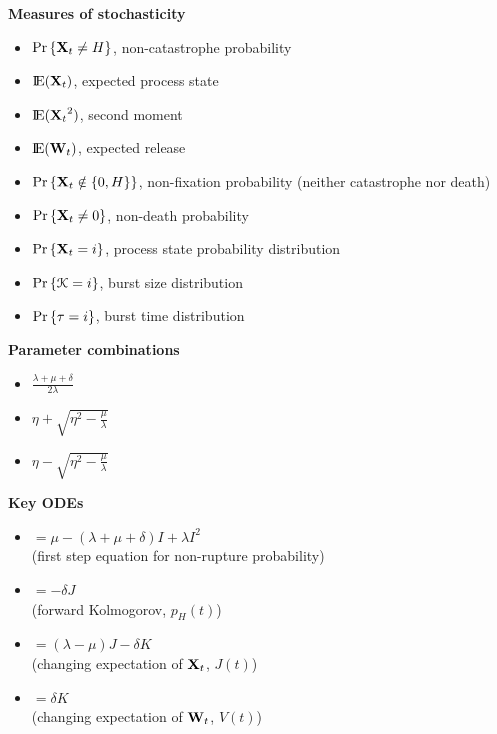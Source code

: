 \noindent
\textbf{Measures of stochasticity}
\begin{itemize}[leftmargin=\indentA]
\item[$I(t)$ :]${\text{Pr}\left\{{{\bf X}_t}\neq H\right\}}$, non-catastrophe probability
\item[$J(t)$ :]${\rm I}\!{\rm E}({{\bf X}_t})$, expected process state 
\item[$K(t)$ :]${\rm I}\!{\rm E}({{\bf X}_t}^2)$, second moment
\item[$V(t)$ :]${\rm I}\!{\rm E}({{\bf W}_t})$, expected release
\item[$I_{\text{fix}}(t)$ :]${\text{Pr}\left\{{{\bf X}_t}\notin \{0,H\}\right\}}$, non-fixation probability (neither catastrophe nor death)
\item[$I_{\text{death}}$ :]${\text{Pr}\left\{{{\bf X}_t}\neq0\right\}}$, non-death probability
\item[$p_k(t)$ :]${\text{Pr}\left\{{{\bf X}_t} = i\right\}}$, process state probability distribution
\item[$P_k$ :]${\text{Pr}\left\{\mathcal{K} = i\right\}}$, burst size distribution 
\item[$\phi_k$ :]${\text{Pr}\left\{\tau = i\right\}}$, burst time distribution 
\end{itemize}

\noindent
\textbf{Parameter combinations}
\begin{itemize}[leftmargin=\indentA]
\item[$\eta$ =]$\frac{\lambda+\mu+\delta}{2\lambda}$
\item[$a$ =]$\eta+\sqrt{\eta^2-\frac{\mu}{\lambda}}$
\item[$b$ =]$\eta-\sqrt{\eta^2-\frac{\mu}{\lambda}}$
\end{itemize}


\noindent
\textbf{Key ODEs}
\begin{itemize}[leftmargin=\indentA]
\item[$\ddt{I}$]$ = \mu - (\lambda + \mu + \delta) I + \lambda I^2$ \\(first step equation for non-rupture probability)
\item[$\ddt{I}$]$= -\delta J$ \\(forward Kolmogorov, $p_{H}(t)$)
\item[$\ddt{J} $]$= (\lambda - \mu)J - \delta K$ \\(changing expectation of ${{\bf X}_t}$, $J(t)$)
\item[$\ddt{V}$]$= \delta K $ \\(changing expectation of ${{\bf W}_t}$, $V(t)$)
\end{itemize}

























